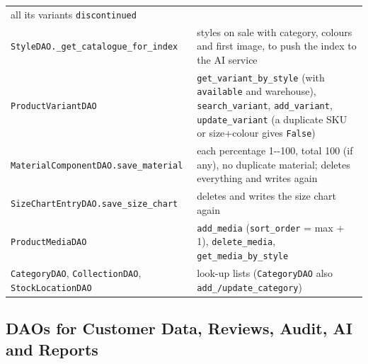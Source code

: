 {\begin{longtable}{@{}
  >{\raggedright\arraybackslash}p{}
  >{\raggedright\arraybackslash}p{}@{}}
all its variants \texttt{discontinued} \\
\texttt{StyleDAO.\allowbreak{}\_\allowbreak{}get\_\allowbreak{}catalogue\_\allowbreak{}for\_\allowbreak{}index} & styles on sale with
category, colours and first image, to push the index to the AI
service \\
\texttt{ProductVariantDAO} & \texttt{get\_\allowbreak{}variant\_\allowbreak{}by\_\allowbreak{}style} (with
\texttt{available} and warehouse), \texttt{search\_\allowbreak{}variant},
\texttt{add\_\allowbreak{}variant}, \texttt{update\_\allowbreak{}variant} (a duplicate SKU or
size+colour gives \texttt{False}) \\
\texttt{MaterialComponentDAO.\allowbreak{}save\_\allowbreak{}material} & each percentage 1-\/-100,
total 100 (if any), no duplicate material; deletes everything and writes
again \\
\texttt{SizeChartEntryDAO.\allowbreak{}save\_\allowbreak{}size\_\allowbreak{}chart} & deletes and writes the
size chart again \\
\texttt{ProductMediaDAO} & \texttt{add\_\allowbreak{}media} (\texttt{sort\_\allowbreak{}order} =
max + 1), \texttt{delete\_\allowbreak{}media}, \texttt{get\_\allowbreak{}media\_\allowbreak{}by\_\allowbreak{}style} \\
\texttt{CategoryDAO}, \texttt{CollectionDAO}, \texttt{StockLocationDAO}
& look-up lists (\texttt{CategoryDAO} also
\texttt{add\_\allowbreak{}/\allowbreak{}update\_\allowbreak{}category}) \\
\end{longtable}}

\hypertarget{daos-for-customer-data-reviews-audit-ai-and-reports}{%
\subsection{DAOs for Customer Data, Reviews, Audit, AI and
Reports}\label{daos-for-customer-data-reviews-audit-ai-and-reports}}

